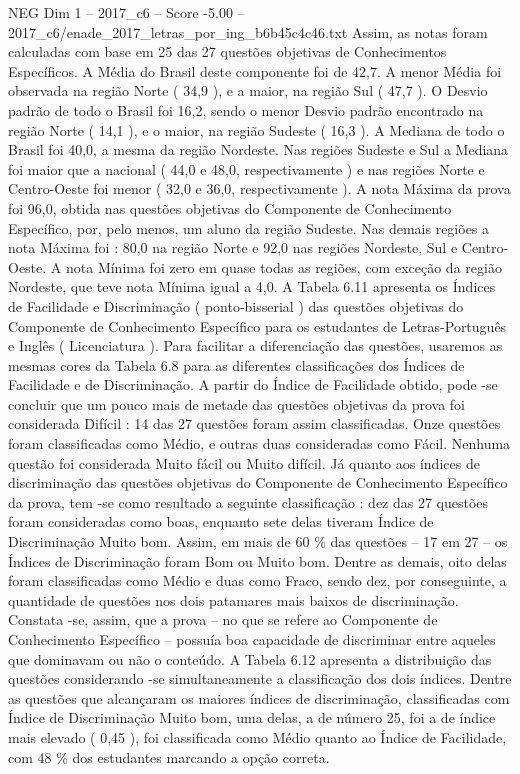 \begin{textsample}{NEG Dim 1 – 2017\_c6 – Score -5.00 – 2017\_c6/enade\_2017\_letras\_por\_ing\_b6b45c4c46.txt}
Assim, as notas foram calculadas com base em 25 das 27 questões objetivas de Conhecimentos Específicos.
A Média do Brasil deste componente foi de 42,7.
A menor Média foi observada na região Norte ( 34,9 ), e a maior, na região Sul ( 47,7 ).
O Desvio padrão de todo o Brasil foi 16,2, sendo o menor Desvio padrão encontrado na região Norte ( 14,1 ), e o maior, na região Sudeste ( 16,3 ).
A Mediana de todo o Brasil foi 40,0, a mesma da região Nordeste.
Nas regiões Sudeste e Sul a Mediana foi maior que a nacional ( 44,0 e 48,0, respectivamente ) e nas regiões Norte e Centro-Oeste foi menor ( 32,0 e 36,0, respectivamente ).
A nota Máxima da prova foi 96,0, obtida nas questões objetivas do Componente de Conhecimento Específico, por, pelo menos, um aluno da região Sudeste.
Nas demais regiões a nota Máxima foi : 80,0 na região Norte e 92,0 nas regiões Nordeste, Sul e Centro-Oeste.
A nota Mínima foi zero em quase todas as regiões, com exceção da região Nordeste, que teve nota Mínima igual a 4,0.
A Tabela 6.11 apresenta os Índices de Facilidade e Discriminação ( ponto-bisserial ) das questões objetivas do Componente de Conhecimento Específico para os estudantes de Letras-Português e Inglês ( Licenciatura ).
Para facilitar a diferenciação das questões, usaremos as mesmas cores da Tabela 6.8 para as diferentes classificações dos Índices de Facilidade e de Discriminação.
A partir do Índice de Facilidade obtido, pode -se concluir que um pouco mais de metade das questões objetivas da prova foi considerada Difícil : 14 das 27 questões foram assim classificadas.
Onze questões foram classificadas como Médio, e outras duas consideradas como Fácil.
Nenhuma questão foi considerada Muito fácil ou Muito difícil.
Já quanto aos índices de discriminação das questões objetivas do Componente de Conhecimento Específico da prova, tem -se como resultado a seguinte classificação : dez das 27 questões foram consideradas como boas, enquanto sete delas tiveram Índice de Discriminação Muito bom.
Assim, em mais de 60 \% das questões – 17 em 27 – os Índices de Discriminação foram Bom ou Muito bom.
Dentre as demais, oito delas foram classificadas como Médio e duas como Fraco, sendo dez, por conseguinte, a quantidade de questões nos dois patamares mais baixos de discriminação.
Constata -se, assim, que a prova – no que se refere ao Componente de Conhecimento Específico – possuía boa capacidade de discriminar entre aqueles que dominavam ou não o conteúdo.
A Tabela 6.12 apresenta a distribuição das questões considerando -se simultaneamente a classificação dos dois índices.
Dentre as questões que alcançaram os maiores índices de discriminação, classificadas com Índice de Discriminação Muito bom, uma delas, a de número 25, foi a de índice mais elevado ( 0,45 ), foi classificada como Médio quanto ao Índice de Facilidade, com 48 \% dos estudantes marcando a opção correta.

\end{textsample}
